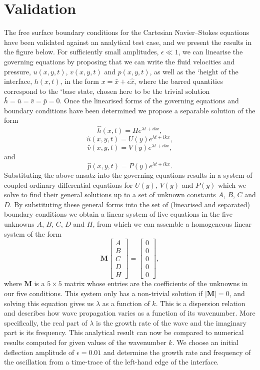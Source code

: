  

\hypertarget{index_validation}{}\section{Validation}\label{index_validation}
The free surface boundary conditions for the Cartesian Navier--Stokes equations have been validated against an analytical test case, and we present the results in the figure below. For sufficiently small amplitudes, $ \epsilon \ll 1 $, we can linearise the governing equations by proposing that we can write the fluid velocities and pressure, $ u(x,y,t) $, $ v(x,y,t) $ and $ p(x,y,t) $, as well as the `height\textquotesingle{} of the interface, $ h(x,t) $, in the form $ x = \bar{x} + \epsilon \hat{x} $, where the barred quantities correspond to the `base\textquotesingle{} state, chosen here to be the trivial solution $ \bar{h} = \bar{u} = \bar{v} = \bar{p} = 0 $. Once the linearised forms of the governing equations and boundary conditions have been determined we propose a separable solution of the form \[ \hat{h}(x,t) = H e^{\lambda t + ikx}, \] \[ \hat{u}(x,y,t) = U(y) e^{\lambda t + ikx}, \] \[ \hat{v}(x,y,t) = V(y) e^{\lambda t + ikx}, \] and \[ \hat{p}(x,y,t) = P(y) e^{\lambda t + ikx}. \] Substituting the above ansatz into the governing equations results in a system of coupled ordinary differential equations for $ U(y) $, $ V(y) $ and $ P(y) $ which we solve to find their general solutions up to a set of unknown constants $ A $, $ B $, $ C $ and $ D $. By substituting these general forms into the set of (linearised and separated) boundary conditions we obtain a linear system of five equations in the five unknowns $ A $, $ B $, $ C $, $ D $ and $ H $, from which we can assemble a homogeneous linear system of the form \[ \mathbf{M} \left[ \begin{array}{c} A \\ B \\ C \\ D \\ H \end{array} \right] = \left[ \begin{array}{c} 0 \\ 0 \\ 0 \\ 0 \\ 0 \end{array} \right], \] where $ \mathbf{M} $ is a $ 5 \times 5 $ matrix whose entries are the coefficients of the unknowns in our five conditions. This system only has a non-\/trivial solution if $ \left| \mathbf{M} \right| = 0 $, and solving this equation gives us $ \lambda $ as a function of $ k $. This is a dispersion relation and describes how wave propagation varies as a function of its wavenumber. More specifically, the real part of $ \lambda $ is the growth rate of the wave and the imaginary part is its frequency. This analytical result can now be compared to numerical results computed for given values of the wavenumber $ k $. We choose an initial deflection amplitude of $ \epsilon = 0.01 $ and determine the growth rate and frequency of the oscillation from a time-\/trace of the left-\/hand edge of the interface.

